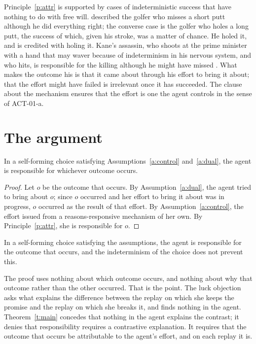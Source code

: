 \documentclass{situationist-preprint}
\begin{document}
Principle~\ref{p:attr} is supported by cases of indeterministic success that have nothing to do with free will. \citet{Austin1956} described the golfer who misses a short putt although he did everything right; the converse case is the golfer who holes a long putt, the success of which, given his stroke, was a matter of chance. He holed it, and is credited with holing it. Kane's assassin, who shoots at the prime minister with a hand that may waver because of indeterminism in his nervous system, and who hits, is responsible for the killing although he might have missed \citep{Kane1999}. What makes the outcome his is that it came about through his effort to bring it about; that the effort might have failed is irrelevant once it has succeeded. The clause about the mechanism ensures that the effort is one the agent controls in the sense of ACT-01-a.

\section{The argument}

\begin{theorem}\label{t:main}
In a self-forming choice satisfying Assumptions~\ref{a:control} and~\ref{a:dual}, the agent is responsible for whichever outcome occurs.
\end{theorem}

\begin{proof}
Let $o$ be the outcome that occurs. By Assumption~\ref{a:dual}, the agent tried to bring about $o$; since $o$ occurred and her effort to bring it about was in progress, $o$ occurred as the result of that effort. By Assumption~\ref{a:control}, the effort issued from a reasons-responsive mechanism of her own. By Principle~\ref{p:attr}, she is responsible for $o$.
\end{proof}

\begin{corollary}\label{c:some}
In a self-forming choice satisfying the assumptions, the agent is responsible for the outcome that occurs, and the indeterminism of the choice does not prevent this.
\end{corollary}

The proof uses nothing about which outcome occurs, and nothing about why that outcome rather than the other occurred. That is the point. The luck objection asks what explains the difference between the replay on which she keeps the promise and the replay on which she breaks it, and finds nothing in the agent. Theorem~\ref{t:main} concedes that nothing in the agent explains the contrast; it denies that responsibility requires a contrastive explanation. It requires that the outcome that occurs be attributable to the agent's effort, and on each replay it is.
\end{document}
